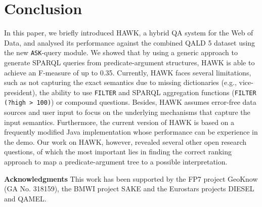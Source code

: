 \documentclass{llncs}
\begin{document}
\section{Conclusion}
\label{sec:conclusion}
In this paper, we briefly introduced HAWK, a hybrid QA system for the Web of Data, and analysed its performance against the combined QALD 5 dataset using the new \texttt{ASK}-query module. 
We showed that by using a generic approach to generate SPARQL queries from predicate-argument structures, HAWK is able to achieve an F-measure of up to 0.35.
Currently, HAWK faces several limitations, such as not capturing the exact semantics due to missing dictionaries (e.g., vice-president), the ability to use \texttt{FILTER} and SPARQL aggregation functions (\texttt{FILTER (?high > 100)}) or compound questions. 
Besides, HAWK assumes error-free data sources and user input to focus on the underlying mechanisms that capture the input semantics.
Furthermore, the current version of HAWK is based on a frequently modified Java implementation whose performance can be experience in the demo. 
Our work on HAWK, however, revealed several other open research questions, of which the most important lies in finding the correct ranking approach to map a predicate-argument tree to a possible interpretation. 

\vspace{.2cm}

\textbf{Acknowledgments}
This work has been supported by the FP7 project GeoKnow (GA No. 318159), the BMWI project SAKE and the Eurostars projects DIESEL and QAMEL.



\end{document}
